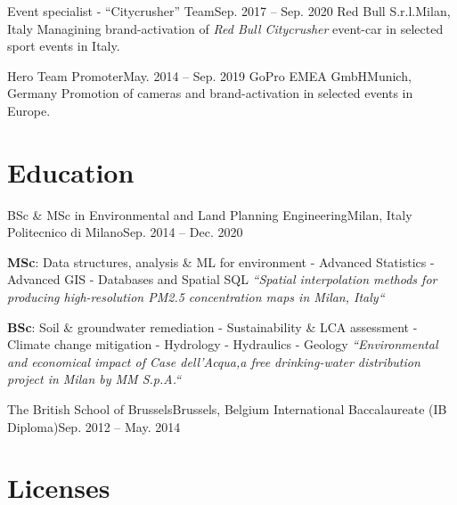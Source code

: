 \documentclass[letterpaper,11pt]{article}
\begin{document}
\sectionElement
{Event specialist - “Citycrusher” Team}{Sep. 2017 -- Sep. 2020}
{Red Bull S.r.l.}{Milan, Italy}
{Managining brand-activation of \textit{Red Bull Citycrusher} event-car in selected sport
  events in Italy.}
{}

\sectionElement
{Hero Team Promoter}{May. 2014 -- Sep. 2019}
{GoPro EMEA GmbH}{Munich, Germany}
{Promotion of cameras and brand-activation in selected events in Europe.}
{}
\sectionElementListEnd


\section{Education}
\sectionElementListStart

\sectionElement
{BSc \& MSc in Environmental and Land Planning Engineering}{Milan, Italy}
{Politecnico di Milano}{Sep. 2014 -- Dec. 2020}
{ {
      \scriptsize
      \begin{hangparas}{1em}{1}
        \textbf{MSc}: Data structures, analysis \& ML for environment - Advanced Statistics - Advanced GIS - Databases and Spatial SQL
        \newline
        \textit{“Spatial interpolation methods for producing high-resolution PM2.5
          concentration maps in Milan, Italy“}

        \textbf{BSc}:  Soil \& groundwater remediation - Sustainability \& LCA assessment - Climate change mitigation - Hydrology - Hydraulics - Geology
        \newline
        \textit{“Environmental and economical impact of Case dell'Acqua,a
          free drinking-water distribution project in Milan by MM S.p.A.“}
      \end{hangparas}
    }
}{}

\sectionElement
{The British School of Brussels}{Brussels, Belgium}
{International Baccalaureate (IB Diploma)}{Sep. 2012 -- May. 2014}
{}{}

\sectionElementListEnd

\section{Licenses}
\end{document}

